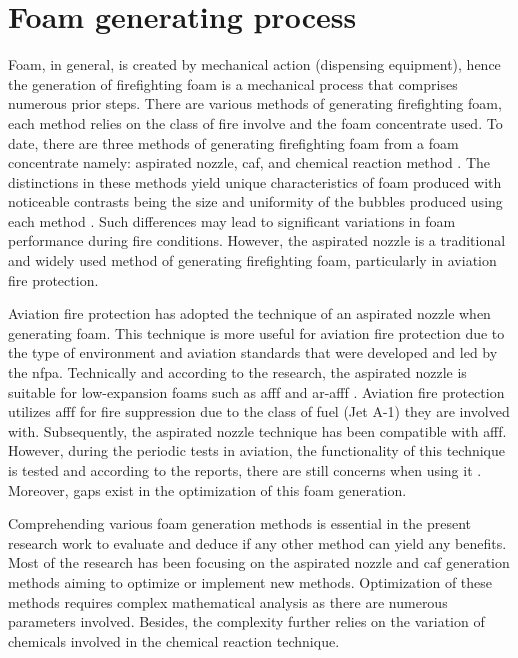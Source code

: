 \section{Foam generating process}
\label{ch2:anchor:foam}
Foam, in general, is created by mechanical action (dispensing equipment), hence the generation of firefighting foam is a mechanical process that comprises numerous prior steps. There are various methods of generating firefighting foam, each method relies on the class of fire involve and the foam concentrate used. To date, there are three methods of generating firefighting foam from a foam concentrate namely: aspirated nozzle, \acrfull{caf}, and chemical reaction method \cite{laundess2012suppression}. The distinctions in these methods yield unique characteristics of foam produced with noticeable contrasts being the size and uniformity of the bubbles produced using each method \cite{laundess2012suppression}. Such differences may lead to significant variations in foam performance during fire conditions. However, the aspirated nozzle is a traditional and widely used method of generating firefighting foam, particularly in aviation fire protection. 

Aviation fire protection has adopted the technique of an aspirated nozzle when generating foam. This technique is more useful for aviation fire protection due to the type of environment and aviation standards that were developed and led by the \Acrfull{nfpa}. Technically and according to the research, the aspirated nozzle is suitable for low-expansion foams such as \acrshort{afff} and \acrshort{ar-afff} \cite{xi2017experimental}.  Aviation fire protection utilizes \acrshort{afff} for fire suppression due to the class of fuel (Jet A-1) they are involved with. Subsequently, the aspirated nozzle technique has been compatible with \acrshort{afff}. However, during the periodic tests in aviation, the functionality of this technique is tested and according to the reports, there are still concerns when using it \cite{laundess2012suppression}. Moreover, gaps exist in the optimization of this foam generation. 

Comprehending various foam generation methods is essential in the present research work to evaluate and deduce if any other method can yield any benefits. Most of the research has been focusing on the aspirated nozzle and \acrshort{caf} generation methods aiming to optimize or implement new methods. Optimization of these methods requires complex mathematical analysis as there are numerous parameters involved. Besides, the complexity further relies on the variation of chemicals involved in the chemical reaction technique. 

